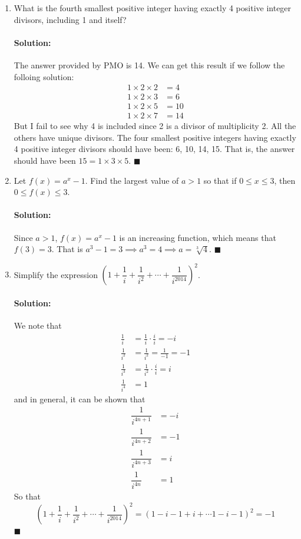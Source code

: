 \documentclass{article}
\newenvironment{solution}{\paragraph{Solution:}}{\hfill$\blacksquare$}
\begin{document}
\begin{enumerate}
	\item What is the fourth smallest positive integer having exactly 4 positive integer divisors, including 1 and itself?
	
	\begin{solution}
		The answer provided by PMO is 14. We can get this result if we follow the folloing solution:
		\begin{align}
			1\times 2\times 2 &= 4\\
			1\times 2 \times 3 & = 6\\
			1\times 2\times 5 & = 10\\
			1\times 2\times 7 & = 14
		\end{align}
		But I fail to see why 4 is included since 2 is a divisor of multiplicity 2. All the others have unique divisors. The four smallest positive integers having exactly 4 positive integer divisors should have been: 6, 10, 14, 15. That is, the answer should have been $15 = 1\times 3\times 5$.
	\end{solution}


	\item Let $f(x)=a^x-1$. Find the largest value of $a>1$ so that if $0\leq x\leq 3$, then $0\leq f(x)\leq 3$.
	
	\begin{solution}
		Since $a>1$, $f(x)=a^x-1$ is an increasing function, which means that  $f(3)=3$. That is $a^3-1=3\implies a^3=4\implies a=\sqrt[3]{4}$.
	\end{solution}


	\item Simplify the expression $\left(1+\dfrac{1}{i}+\dfrac{1}{i^2}+\cdots+\dfrac{1}{i^{2014}}\right)^2$.
	
	
	\begin{solution}
		We note that
		\begin{align*}
			\frac{1}{i}&=\frac{1}{i}\cdot\frac{i}{i}=-i\\
			\frac{1}{i^2}&=\frac{1}{i^2}=\frac{1}{-1}=-1\\
			\frac{1}{i^3}&=\frac{1}{i^2}\cdot\frac{i}{i}=i\\
			\frac{1}{i^4}&=1
		\end{align*}
		and in general, it can be shown that
		\begin{align*}
		\dfrac{1}{i^{4n+1}}&=-i\\
		\dfrac{1}{i^{4n+2}}&=-1\\
		\dfrac{1}{i^{4n+3}}&=i\\
		\dfrac{1}{i^{4n}}&=1
		\end{align*}
		So that
		\begin{equation*}
		\left(1+\dfrac{1}{i}+\dfrac{1}{i^2}+\cdots+\dfrac{1}{i^{2014}}\right)^2=(1-i-1+i+\cdots 1-i-1)^2=-1
		\end{equation*}
	\end{solution}


\end{enumerate}
\end{document}
